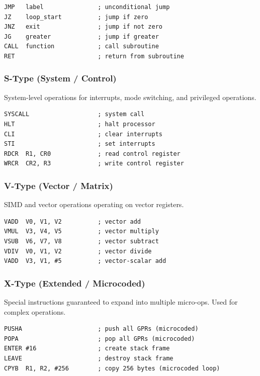 \documentclass[11pt]{article}
\begin{document}
\begin{lstlisting}
JMP   label               ; unconditional jump
JZ    loop_start          ; jump if zero
JNZ   exit                ; jump if not zero
JG    greater             ; jump if greater
CALL  function            ; call subroutine
RET                       ; return from subroutine
\end{lstlisting}

\subsubsection{S-Type (System / Control)}

System-level operations for interrupts, mode switching, and privileged operations.

\begin{lstlisting}
SYSCALL                   ; system call
HLT                       ; halt processor
CLI                       ; clear interrupts
STI                       ; set interrupts
RDCR  R1, CR0             ; read control register
WRCR  CR2, R3             ; write control register
\end{lstlisting}

\subsubsection{V-Type (Vector / Matrix)}

SIMD and vector operations operating on vector registers.

\begin{lstlisting}
VADD  V0, V1, V2          ; vector add
VMUL  V3, V4, V5          ; vector multiply
VSUB  V6, V7, V8          ; vector subtract
VDIV  V0, V1, V2          ; vector divide
VADD  V3, V1, #5          ; vector-scalar add
\end{lstlisting}

\subsubsection{X-Type (Extended / Microcoded)}

Special instructions guaranteed to expand into multiple micro-ops. Used for complex operations.

\begin{lstlisting}
PUSHA                     ; push all GPRs (microcoded)
POPA                      ; pop all GPRs (microcoded)
ENTER #16                 ; create stack frame
LEAVE                     ; destroy stack frame
CPYB  R1, R2, #256        ; copy 256 bytes (microcoded loop)
\end{lstlisting}
\end{document}
